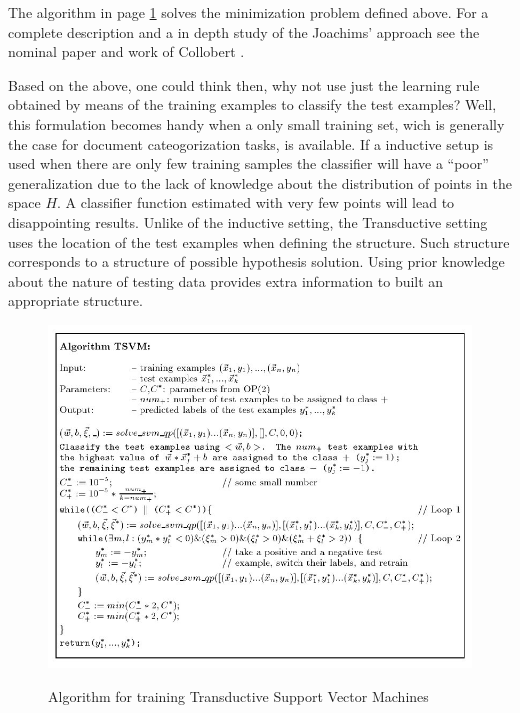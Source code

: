 The algorithm in page \ref{fig:alg-tsvm} solves the minimization problem defined above. For a complete description and a in depth study of the Joachims' approach see the nominal paper \cite{Joachims99c}
and work of Collobert \cite{1248609}.

Based on the above, one could think then, why not use just the learning rule obtained by means of the training examples to classify
the test examples? Well, this formulation becomes handy when a only small
training set, wich is generally the case for document cateogorization tasks,
is available. If a inductive setup is used when there are only few training samples the classifier will have a \textquotedblleft{}poor\textquotedblright{}
generalization due to the lack of knowledge about the distribution
of points in the space $H$. A classifier function estimated with very few points will lead to
disappointing results. Unlike of the inductive setting, the Transductive
setting uses the location of the test examples when defining the structure.
Such structure corresponds to a structure of possible hypothesis solution.
Using prior knowledge about the nature of testing data provides extra
information to built an appropriate structure. 

\begin{figure}[H]
\begin{centering}
\includegraphics[scale=0.3]{images/joachims-algorithm}\label{fig:alg-tsvm}
\par\end{centering}
\caption{Algorithm for training Transductive Support Vector Machines \cite{Joachims99c}}
\end{figure}


